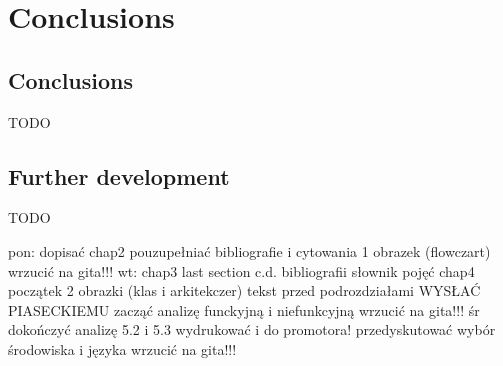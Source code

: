 \chapter{Conclusions}

\section{Conclusions}

TODO

\section{Further development}

TODO


pon:
    dopisać chap2
    pouzupełniać bibliografie i cytowania
    1 obrazek (flowczart)
    wrzucić na gita!!!
wt:
    chap3 last section
    c.d. bibliografii
    słownik pojęć
    chap4 początek
    2 obrazki (klas i arkitekczer)
    tekst przed podrozdziałami
        WYSŁAĆ PIASECKIEMU
    zacząć analizę funckyjną i niefunkcyjną
    wrzucić na gita!!!
śr
    dokończyć analizę
    5.2 i 5.3
    wydrukować i do promotora!
    przedyskutować wybór środowiska i języka
    wrzucić na gita!!!